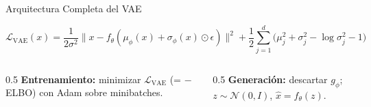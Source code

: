 \documentclass[aspectratio=169, 10pt]{beamer}
\newcommand{\formula}[1]{%
	\begin{tcolorbox}[colback=UCMBlue!8, colframe=UCMBlue, arc=4pt,
		boxsep=2pt, left=6pt, right=6pt, top=3pt, bottom=3pt]
		#1
	\end{tcolorbox}
}
\begin{document}
\begin{frame}{Arquitectura Completa del VAE}
	\formula{
		\[
		\mathcal{L}_{\text{VAE}}(x) = \frac{1}{2\sigma^2}\big\|x - f_\theta(\mu_\phi(x) + \sigma_\phi(x)\odot\epsilon)\big\|^2
		+ \frac{1}{2}\sum_{j=1}^{d}\big(\mu_j^2 + \sigma_j^2 - \log\sigma_j^2 - 1\big)
		\]
	}

	\begin{columns}[T]
		\begin{column}{0.5\textwidth}
			\small \textbf{Entrenamiento:} minimizar $\mathcal{L}_{\text{VAE}}$ (= $-$ELBO) con Adam sobre minibatches.
		\end{column}
		\begin{column}{0.5\textwidth}
			\small \textbf{Generaci\'on:} descartar $g_\phi$; $z \sim \mathcal{N}(0,I)$, $\hat x = f_\theta(z)$.
		\end{column}
	\end{columns}

\end{frame}
\end{document}
